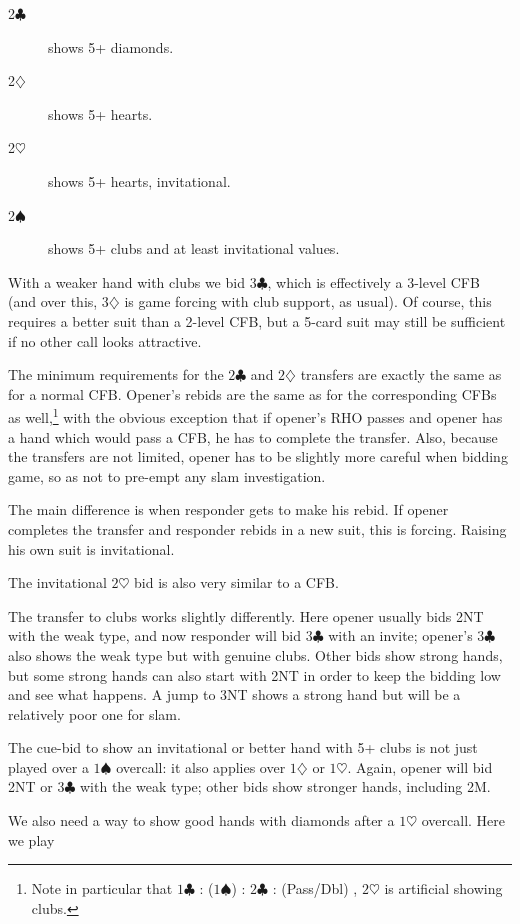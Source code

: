 \documentclass{article}
\newcommand{\sz}{\spadesuit}
\newcommand{\hz}{\heartsuit}
\newcommand{\dz}{\diamondsuit}
\newcommand{\cz}{\clubsuit}
\begin{document}
\begin{description}
\item[2$\cz$] shows 5+ diamonds.
\item[2$\dz$] shows 5+ hearts.
\item[2$\hz$] shows 5+ hearts, invitational.
\item[2$\sz$] shows 5+ clubs and at least invitational values.
\end{description}
With a weaker hand with clubs we bid $3\cz$, which is effectively a 3-level CFB (and over this, $3\dz$ is game forcing with club support, as usual). Of course, this requires a better suit than a 2-level CFB, but a 5-card suit may still be sufficient if no other call looks attractive.

The minimum requirements for the $2\cz$ and $2\dz$ transfers are exactly the same as for a normal CFB. Opener's rebids are the same as for the corresponding CFBs as well,\footnote{Note in particular that $1\cz$ : ($1\sz$) : $2\cz$ : (Pass/Dbl) , $2\hz$ is artificial showing clubs.} with the obvious exception that if opener's RHO passes and opener has a hand which would pass a CFB, he has to complete the transfer. Also, because the transfers are not limited, opener has to be slightly more careful when bidding game, so as not to pre-empt any slam investigation.

The main difference is when responder gets to make his rebid. If opener completes the transfer and responder rebids in a new suit, this is forcing. Raising his own suit is invitational.

The invitational $2\hz$ bid is also very similar to a CFB.

The transfer to clubs works slightly differently. Here opener usually bids 2NT with the weak type, and now responder will bid $3\cz$ with an invite; opener's $3\cz$ also shows the weak type but with genuine clubs. Other bids show strong hands, but some strong hands can also start with 2NT in order to keep the bidding low and see what happens. A jump to 3NT shows a strong hand but will be a relatively poor one for slam.

\vspace{4mm}
The cue-bid to show an invitational or better hand with 5+ clubs is not just played over a $1\sz$ overcall: it also applies over $1\dz$ or $1\hz$. Again, opener will bid 2NT or $3\cz$ with the weak type; other bids show stronger hands, including 2M.

We also need a way to show good hands with diamonds after a $1\hz$ overcall. Here we play
\end{document}
